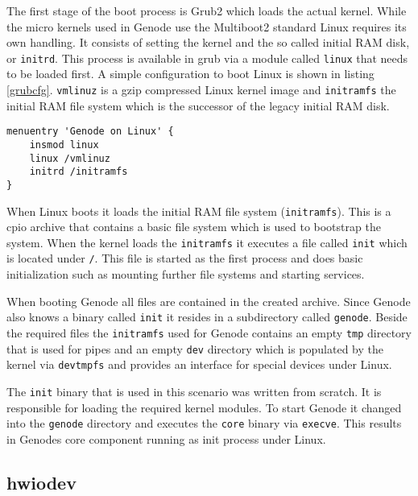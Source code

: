 \documentclass[
a4paper,
12pt,
notitlepage,
parskip=half,
DIV=11,
]{scrbook}
\begin{document}
		
		The first stage of the boot process is Grub2 which loads the actual kernel.
		While the micro kernels used in Genode use the Multiboot2 standard Linux requires its own handling.
		It consists of setting the kernel and the so called initial RAM disk, or \texttt{initrd}.
		This process is available in grub via a module called \texttt{linux} that needs to be loaded first.
		A simple configuration to boot Linux is shown in listing \ref{grubcfg}.
		\texttt{vmlinuz} is a gzip compressed Linux kernel image and \texttt{initramfs} the initial RAM file system which is the successor of the legacy initial RAM disk.
		
		\begin{lstlisting}
menuentry 'Genode on Linux' {
	insmod linux
	linux /vmlinuz
	initrd /initramfs
}
		\end{lstlisting}
		
		When Linux boots it loads the initial RAM file system (\texttt{initramfs}).
		This is a cpio archive that contains a basic file system which is used to bootstrap the system.
		When the kernel loads the \texttt{initramfs} it executes a file called \texttt{init} which is located under \texttt{/}.
		This file is started as the first process and does basic initialization such as mounting further file systems and starting services.
		
		When booting Genode all files are contained in the created archive.
		Since Genode also knows a binary called \texttt{init} it resides in a subdirectory called \texttt{genode}.
		Beside the required files the \texttt{initramfs} used for Genode contains an empty \texttt{tmp} directory that is used for pipes and an empty \texttt{dev} directory which is populated by the kernel via \texttt{devtmpfs} and provides an interface for special devices under Linux.
		
		The \texttt{init} binary that is used in this scenario was written from scratch.
		It is responsible for loading the required kernel modules.
		To start Genode it changed into the \texttt{genode} directory and executes the \texttt{core} binary via \texttt{execve}.
		This results in Genodes core component running as init process under Linux.
		
		\subsection{hwiodev}
		
\end{document}
